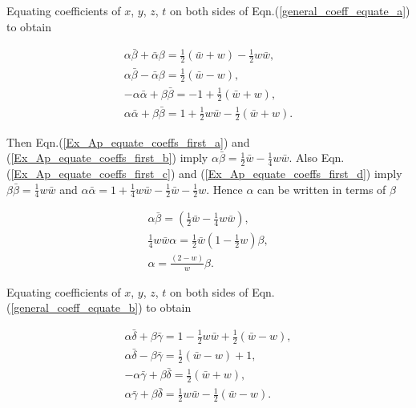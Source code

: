 \begin{appendix}
\noindent Equating coefficients of $x$, $y$, $z$, $t$ on both sides of Eqn.(\ref{general_coeff_equate_a}) to obtain

\begin{subequations}
\begin{gather}\label{Ex_Ap_equate_coeffs_first_a}
\alpha \bar{\beta} + \bar{\alpha} \beta = \frac{1}{2}(\bar{w}+w) - \frac{1}{2}w\bar{w}, \\\label{Ex_Ap_equate_coeffs_first_b}
\alpha \bar{\beta} - \bar{\alpha} \beta = \frac{1}{2} (\bar{w} - w), \\\label{Ex_Ap_equate_coeffs_first_c}
-\alpha \bar{\alpha} + \beta \bar{\beta} = - 1 + \frac{1}{2}(\bar{w} + w), \\\label{Ex_Ap_equate_coeffs_first_d}
\alpha \bar{\alpha} + \beta \bar{\beta} = 1 + \frac{1}{2}w\bar{w} - \frac{1}{2}(\bar{w} + w). 
\end{gather}
\end{subequations}

\noindent Then Eqn.(\ref{Ex_Ap_equate_coeffs_first_a}) and (\ref{Ex_Ap_equate_coeffs_first_b}) imply $\alpha \bar{\beta} = \frac{1}{2}\bar{w} - \frac{1}{4}w\bar{w}$. Also Eqn.(\ref{Ex_Ap_equate_coeffs_first_c}) and (\ref{Ex_Ap_equate_coeffs_first_d}) imply $\beta\bar{\beta} = \frac{1}{4}w\bar{w}$ and $\alpha \bar{\alpha} = 1 + \frac{1}{4}w\bar{w} - \frac{1}{2}\bar{w} - \frac{1}{2}w$. Hence $\alpha$ can be written in terms of $\beta$

\begin{gather*}
\alpha \bar{\beta} = (\frac{1}{2}\bar{w} - \frac{1}{4}w\bar{w}), \\
\frac{1}{4} w \bar{w} \alpha = \frac{1}{2}\bar{w}(1-\frac{1}{2}w)\beta, \\
\alpha = \frac{(2-w)}{w}\beta.
\end{gather*}

Equating coefficients of $x$, $y$, $z$, $t$ on both sides of Eqn.(\ref{general_coeff_equate_b}) to obtain

\begin{subequations}
\begin{gather}\label{Ex_Ap_equate_coeffs_second_a}
\alpha \bar{\delta} + \beta\bar{\gamma} = 1 - \frac{1}{2}w\bar{w} + \frac{1}{2}(\bar{w}-w), \\\label{Ex_Ap_equate_coeffs_second_b}
\alpha \bar{\delta} - \beta\bar{\gamma} = \frac{1}{2}(\bar{w}-w) + 1,\\\label{Ex_Ap_equate_coeffs_second_c}
-\alpha\bar{\gamma} + \beta \bar{\delta} = \frac{1}{2}(\bar{w} + w) ,\\\label{Ex_Ap_equate_coeffs_second_d}
\alpha\bar{\gamma} + \beta \bar{\delta} = \frac{1}{2}w\bar{w} - \frac{1}{2}(\bar{w}-w). 
\end{gather}
\end{subequations}


\end{appendix}
